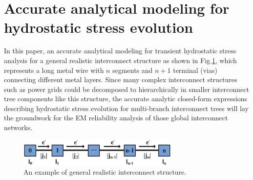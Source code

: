 \section{Accurate analytical modeling for hydrostatic stress evolution}
\label{sec:multi_segment}
In this paper, an accurate analytical modeling for transient
hydrostatic stress analysis for a general realistic interconnect
structure as shown in Fig.\ref{fig:interconnect_tree}, which
represents a long metal wire with $n$ segments and $n+1$ terminal
(vias) connecting different metal layers. Since many complex
interconnect structures such as power grids could be decomposed to
hierarchically in smaller interconnect tree components like this
structure, the accurate analytic closed-form expressions describing
hydrostatic stress evolution for multi-branch interconnect trees will
lay the groundwork for the EM reliability analysis of those global
interconnect networks.

\label{sec:analytical_stress}
\begin{figure}[ht] \centering
\includegraphics[width=80mm]{Sn.eps}
\caption{An example of general realistic interconnect structure.}
  \label{fig:interconnect_tree}
  \vspace{-0.12in}
\end{figure}

